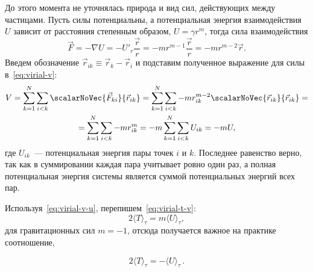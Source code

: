 До этого момента не уточнялась природа и вид сил, действующих между частицами. Пусть силы потенциальны, а потенциальная энергия взаимодействия~$U$ зависит от расстояния степенным образом, $U = \gamma r^m$, тогда сила взаимодействия 
\begin{equation*}
    \vec F = -\nabla U = - U'_r \frac{\vec{r}}{r} = -mr^{m - 1} \frac{\vec{r}}{r} = -m r^{m - 2} \vec r.
\end{equation*}
Введем обозначение $\vec r_{ik} \equiv \vec r_k - \vec r_i$ и подставим полученное выражение для силы в~\eqref{eq:virial-v}:
\begin{multline}
    V 
    = \sum_{k = 1}^N \sum_{i < k} \scalarNoVec{\vec F_{ki}}{\vec r_{ik}}
    = \sum_{k = 1}^N \sum_{i < k} -m r_{ik}^{m - 2} \scalarNoVec{\vec r_{ik}}{\vec r_{ik}} = \\
    = \sum_{k = 1}^N \sum_{i < k} -m r_{ik}^{m}
    = -m \sum_{k = 1}^N \sum_{i < k} U_{ik} = -mU,
    \label{eq:virial-v-u}
\end{multline}
где $U_{ik}$~--- потенциальная энергия пары точек $i$ и $k$. Последнее равенство верно, так как в суммировании каждая пара учитывает ровно один раз, а полная потенциальная энергия системы является суммой потенциальных энергий всех пар.

Используя~\eqref{eq:virial-v-u}, перепишем~\eqref{eq:virial-t-v}: 
\begin{equation*}
    2 \langle T \rangle_\tau = m \langle U \rangle_\tau,
\end{equation*} 
для гравитационных сил $m = -1$, отсюда получается важное на практике соотношение, 

\begin{equation}
    \boxed{2\langle T \rangle_\tau = -\langle U \rangle_\tau\!}\,.
\end{equation}

